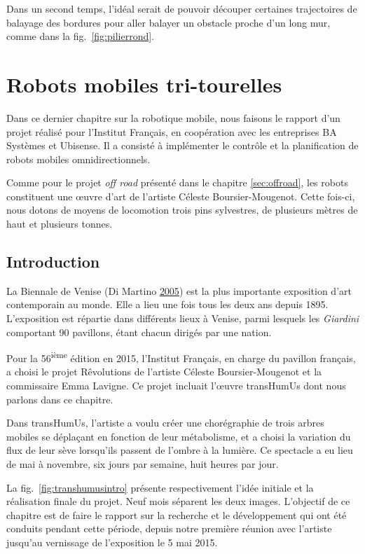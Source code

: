 \documentclass[french,A4paper,]{book}
\begin{document}
Dans un second temps, l'idéal serait de pouvoir découper certaines
trajectoires de balayage des bordures pour aller balayer un obstacle
proche d'un long mur, comme dans la fig.~\ref{fig:pilierrond}.

\chapter{Robots mobiles tri-tourelles}\label{sec:transhumus}

Dans ce dernier chapitre sur la robotique mobile, nous faisons le
rapport d'un projet réalisé pour l'Institut Français, en coopération
avec les entreprises BA Systèmes et Ubisense. Il a consisté à
implémenter le contrôle et la planification de robots mobiles
omnidirectionnels.

Comme pour le projet \emph{off road} présenté dans le chapitre
\ref{sec:offroad}, les robots constituent une œuvre d'art de l'artiste
Céleste Boursier-Mougenot. Cette fois-ci, nous dotons de moyens de
locomotion trois pins sylvestres, de plusieurs mètres de haut et
plusieurs tonnes.

\section{Introduction}\label{sec:transintro}

La Biennale de Venise (Di Martino
\protect\hyperlink{ref-DiMartino}{2005}) est la plus importante
exposition d'art contemporain au monde. Elle a lieu une fois tous les
deux ans depuis 1895. L'exposition est répartie dans différents lieux à
Venise, parmi lesquels les \emph{Giardini} comportant 90 pavillons,
étant chacun dirigés par une nation.

Pour la 56\textsuperscript{ième} édition en 2015, l'Institut Français,
en charge du pavillon français, a choisi le projet Rêvolutions de
l'artiste Céleste Boursier-Mougenot et la commissaire Emma Lavigne. Ce
projet incluait l'œuvre transHumUs dont nous parlons dans ce chapitre.

Dans transHumUs, l'artiste a voulu créer une chorégraphie de trois
arbres mobiles se déplaçant en fonction de leur métabolisme, et a choisi
la variation du flux de leur sève lorsqu'ils passent de l'ombre à la
lumière. Ce spectacle a eu lieu de mai à novembre, six jours par
semaine, huit heures par jour.

La fig.~\ref{fig:transhumusintro} présente respectivement l'idée
initiale et la réalisation finale du projet. Neuf mois séparent les deux
images. L'objectif de ce chapitre est de faire le rapport sur la
recherche et le développement qui ont été conduits pendant cette
période, depuis notre première réunion avec l'artiste jusqu'au
vernissage de l'exposition le 5 mai 2015.
\end{document}
